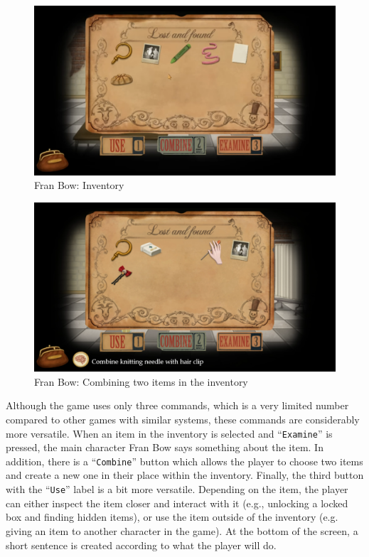 \begin{figure}[H]
\centering
\includegraphics[width=.8\linewidth]{img/I-FB.png}
\caption{Fran Bow: Inventory}
\label{fig:I-FranBow}
\end{figure}


\begin{figure}[H]
\centering
\includegraphics[width=.8\linewidth]{img/Fran_Bow.png}
\caption{Fran Bow: Combining two items in the inventory}
\label{fig:C-FranBow}
\end{figure}

Although the game uses only three commands, which is a very limited number compared to other games with similar systems, these commands are considerably more versatile. When an item in the inventory is selected and “\texttt{Examine}” is pressed, the main character Fran Bow says something about the item. In addition, there is a “\texttt{Combine}” button which allows the player to choose two items and create a new one in their place within the inventory. Finally, the third button with the “\texttt{Use}” label is a bit more versatile. Depending on the item, the player can either inspect the item closer and interact with it (e.g., unlocking a locked box and finding hidden items), or use the item outside of the inventory (e.g. giving an item to another character in the game). At the bottom of the screen, a short sentence is created according to what the player will do.

